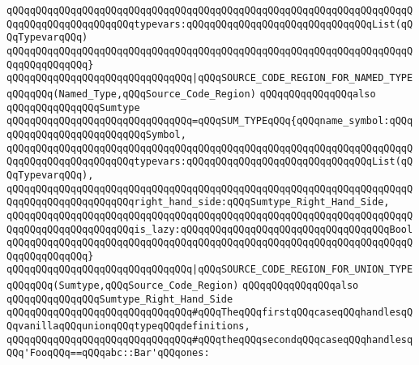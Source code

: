 \verb|qQQqqQQqqQQqqQQqqQQqqQQqqQQqqQQqqQQqqQQqqQQqqQQqqQQqqQQqqQQqqQQqqQQqqQQqqQQqqQQqqQQqqQQqqQQqtypevars:qQQqqQQqqQQqqQQqqQQqqQQqqQQqqQQqList(qQQqTypevarqQQq)|\newline
\verb|qQQqqQQqqQQqqQQqqQQqqQQqqQQqqQQqqQQqqQQqqQQqqQQqqQQqqQQqqQQqqQQqqQQqqQQqqQQqqQQqqQQq}|\newline
\newline
\verb|qQQqqQQqqQQqqQQqqQQqqQQqqQQqqQQq|\verb#|qQQqSOURCE_CODE_REGION_FOR_NAMED_TYPEqQQqqQQq(Named_Type,qQQqSource_Code_Region)#\newline
\newline
\newline
\newline
\verb|qQQqqQQqqQQqqQQqalso|\newline
\verb|qQQqqQQqqQQqqQQqSumtype|\newline
\newline
\verb|qQQqqQQqqQQqqQQqqQQqqQQqqQQqqQQq=qQQqSUM_TYPEqQQq{qQQqname_symbol:qQQqqQQqqQQqqQQqqQQqqQQqqQQqSymbol,|\newline
\verb|qQQqqQQqqQQqqQQqqQQqqQQqqQQqqQQqqQQqqQQqqQQqqQQqqQQqqQQqqQQqqQQqqQQqqQQqqQQqqQQqqQQqqQQqqQQqtypevars:qQQqqQQqqQQqqQQqqQQqqQQqqQQqqQQqList(qQQqTypevarqQQq),|\newline
\verb|qQQqqQQqqQQqqQQqqQQqqQQqqQQqqQQqqQQqqQQqqQQqqQQqqQQqqQQqqQQqqQQqqQQqqQQqqQQqqQQqqQQqqQQqqQQqright_hand_side:qQQqSumtype_Right_Hand_Side,|\newline
\verb|qQQqqQQqqQQqqQQqqQQqqQQqqQQqqQQqqQQqqQQqqQQqqQQqqQQqqQQqqQQqqQQqqQQqqQQqqQQqqQQqqQQqqQQqqQQqis_lazy:qQQqqQQqqQQqqQQqqQQqqQQqqQQqqQQqqQQqBool|\newline
\verb|qQQqqQQqqQQqqQQqqQQqqQQqqQQqqQQqqQQqqQQqqQQqqQQqqQQqqQQqqQQqqQQqqQQqqQQqqQQqqQQqqQQq}|\newline
\newline
\verb|qQQqqQQqqQQqqQQqqQQqqQQqqQQqqQQq|\verb#|qQQqSOURCE_CODE_REGION_FOR_UNION_TYPEqQQqqQQq(Sumtype,qQQqSource_Code_Region)#\newline
\newline
\newline
\newline
\verb|qQQqqQQqqQQqqQQqalso|\newline
\verb|qQQqqQQqqQQqqQQqSumtype_Right_Hand_Side|\newline
\newline
\verb|qQQqqQQqqQQqqQQqqQQqqQQqqQQqqQQq#qQQqTheqQQqfirstqQQqcaseqQQqhandlesqQQqvanillaqQQqunionqQQqtypeqQQqdefinitions,|\newline
\verb|qQQqqQQqqQQqqQQqqQQqqQQqqQQqqQQq#qQQqtheqQQqsecondqQQqcaseqQQqhandlesqQQq'FooqQQq==qQQqabc::Bar'qQQqones:|\newline
